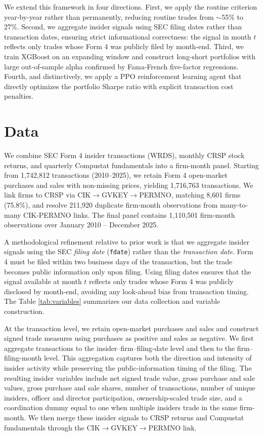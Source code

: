 \documentclass{article}
\begin{document}
We extend this framework in four directions. First, we apply the routine criterion year-by-year rather than permanently, reducing routine trades from $\sim$55\% to 27\%. Second, we aggregate insider signals using SEC filing dates rather than transaction dates, ensuring strict informational correctness: the signal in month $t$ reflects only trades whose Form 4 was publicly filed by month-end. Third, we train XGBoost on an expanding window and construct long-short portfolios with large out-of-sample alpha confirmed by Fama-French five-factor regressions. Fourth, and distinctively, we apply a PPO reinforcement learning agent that directly optimizes the portfolio Sharpe ratio with explicit transaction cost penalties.

\section{Data}

We combine SEC Form 4 insider transactions (WRDS), monthly CRSP stock returns, and quarterly Compustat fundamentals into a firm-month panel. Starting from 1,742,812 transactions (2010--2025), we retain Form 4 open-market purchases and sales with non-missing prices, yielding 1,716,763 transactions. We link firms to CRSP via CIK$\to$GVKEY$\to$PERMNO, matching 8,601 firms (75.8\%), and resolve 211,920 duplicate firm-month observations from many-to-many CIK-PERMNO links. The final panel contains 1,110,501 firm-month observations over January 2010 -- December 2025.

A methodological refinement relative to prior work is that we aggregate insider signals using the SEC \textit{filing date} (\texttt{fdate}) rather than the \textit{transaction date}. Form 4 must be filed within two business days of the transaction, but the trade becomes public information only upon filing. Using filing dates ensures that the signal available at month $t$ reflects only trades whose Form 4 was publicly disclosed by month-end, avoiding any look-ahead bias from transaction timing. The Table \ref{tab:variables} summarizes our data collection and variable construction.

At the transaction level, we retain open-market purchases and sales and construct signed trade measures using purchases as positive and sales as negative. We first aggregate transactions to the insider--firm--filing-date level and then to the firm--filing-month level. This aggregation captures both the direction and intensity of insider activity while preserving the public-information timing of the filing. The resulting insider variables include net signed trade value, gross purchase and sale values, gross purchase and sale shares, number of transactions, number of unique insiders, officer and director participation, ownership-scaled trade size, and a coordination dummy equal to one when multiple insiders trade in the same firm-month. We then merge these insider signals to CRSP returns and Compustat fundamentals through the CIK$\to$GVKEY$\to$PERMNO link.
\end{document}
